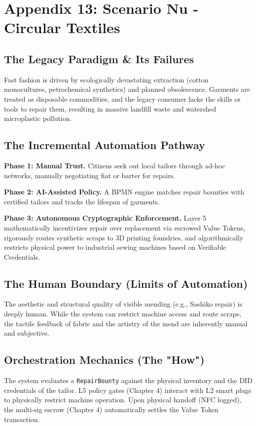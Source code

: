 \chapter{Appendix 13: Scenario Nu - Circular Textiles}

\section{The Legacy Paradigm \& Its Failures}
Fast fashion is driven by ecologically devastating extraction (cotton monocultures, petrochemical synthetics) and planned obsolescence. Garments are treated as disposable commodities, and the legacy consumer lacks the skills or tools to repair them, resulting in massive landfill waste and watershed microplastic pollution.

\section{The Incremental Automation Pathway}
\textbf{Phase 1: Manual Trust.} Citizens seek out local tailors through ad-hoc networks, manually negotiating fiat or barter for repairs.

\textbf{Phase 2: AI-Assisted Policy.} A BPMN engine matches repair bounties with certified tailors and tracks the lifespan of garments.

\textbf{Phase 3: Autonomous Cryptographic Enforcement.} Layer 5 mathematically incentivizes repair over replacement via escrowed Value Tokens, rigorously routes synthetic scraps to 3D printing foundries, and algorithmically restricts physical power to industrial sewing machines based on Verifiable Credentials.

\section{The Human Boundary (Limits of Automation)}
The aesthetic and structural quality of visible mending (e.g., Sashiko repair) is deeply human. While the system can restrict machine access and route scraps, the tactile feedback of fabric and the artistry of the mend are inherently manual and subjective.

\section{Orchestration Mechanics (The "How")}
The system evaluates a \texttt{RepairBounty} against the physical inventory and the DID credentials of the tailor. L5 policy gates (Chapter 4) interact with L2 smart plugs to physically restrict machine operation. Upon physical handoff (NFC logged), the multi-sig escrow (Chapter 4) automatically settles the Value Token transaction.
